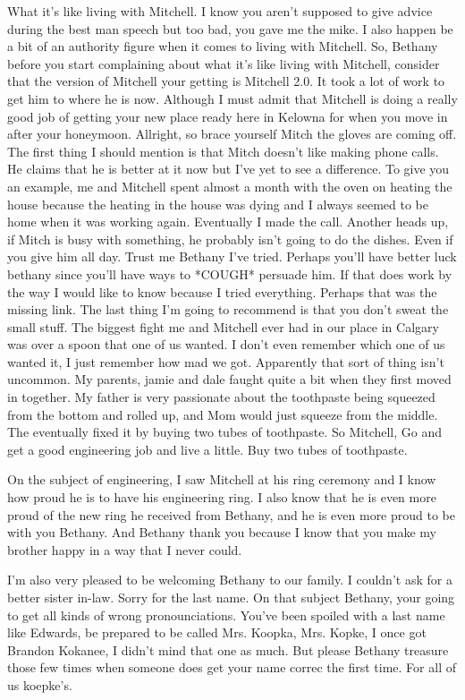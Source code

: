 \documentclass{letter}
\begin{document}
What it's like living with Mitchell.
	I know you aren't supposed to give advice during the best man speech but too bad, you gave me the mike. I also happen be a bit of an authority figure when it comes to living with Mitchell.
	So, Bethany before you start complaining about what it's like living with Mitchell, consider that the version of Mitchell your getting is Mitchell 2.0. It took a lot of work to get him to where he is now. Although I must admit that Mitchell is doing a really good job of getting your new place ready here in Kelowna for when you move in after your honeymoon.
	Allright, so brace yourself Mitch the gloves are coming off. The first thing I should mention is that Mitch doesn't like making phone calls. He claims that he is better at it now but I've yet to see a difference. To give you an example, me and Mitchell spent almost a month with the oven on heating the house because the heating in the house was dying and I always seemed to be home when it was working again. Eventually I made the call.
	Another heads up, if Mitch is busy with something, he probably isn't going to do the dishes. Even if you give him all day. Trust me Bethany I've tried. Perhaps you'll have better luck bethany since you'll have ways to *COUGH* persuade him. If that does work by the way I would like to know because I tried everything. Perhaps that was the missing link. 
	The last thing I'm going to recommend is that you don't sweat the small stuff. The biggest fight me and Mitchell ever had in our place in Calgary was over a spoon that one of us wanted. I don't even remember which one of us wanted it, I just remember how mad we got. Apparently that sort of thing isn't uncommon. My parents, jamie and dale faught quite a bit when they first moved in together. My father is very passionate about the toothpaste being squeezed from the bottom and rolled up, and Mom would just squeeze from the middle. The eventually fixed it by buying two tubes of toothpaste. So Mitchell, Go and get a good engineering job and live a little. Buy two tubes of toothpaste.

On the subject of engineering, I saw Mitchell at his ring ceremony and I know how proud he is to have his engineering ring. I also know that he is even more proud of the new ring he received from Bethany, and he is even more proud to be with you Bethany. And Bethany thank you because I know that you make my brother happy in a way that I never could.

I'm also very pleased to be welcoming Bethany to our family. I couldn't ask for a better sister in-law. Sorry for the last name. On that subject Bethany, your going to get all kinds of wrong pronounciations. You've been spoiled with a last name like Edwards, be prepared to be called Mrs. Koopka, Mrs. Kopke, I once got Brandon Kokanee, I didn't mind that one as much. But please Bethany treasure those few times when someone does get your name correc the first time. For all of us koepke's.
\end{document}

